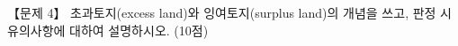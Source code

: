 \begin{longquestion}{【문제 4】}
초과토지(excess land)와 잉여토지(surplus land)의 개념을 쓰고, 판정 시 유의사항에 대하여 설명하시오. (10점) \par
\end{longquestion}
